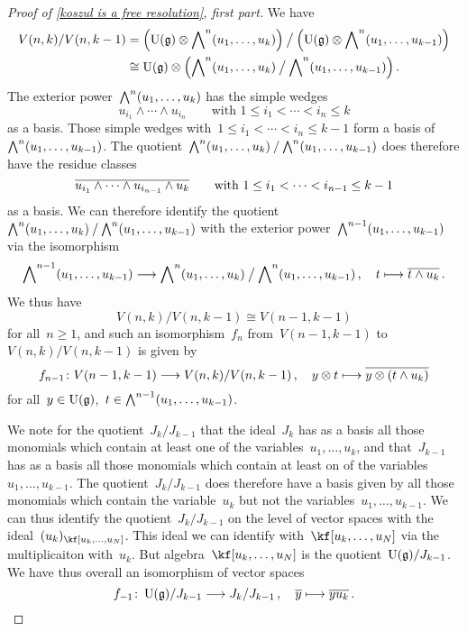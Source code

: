 \begin{proof}[Proof of \cref{koszul is a free resolution}, first part]
  We have
  \begin{align*}
    V(n,k) / V(n, k-1)
    &=
    \Bigl( \operatorname{U}(\mathfrak{g}) \otimes \operatorname{\bigwedge}^n( u_1, \dotsc, u_k ) \Bigr)
    \mathbin{\big/}
    \Bigl( \operatorname{U}(\mathfrak{g}) \otimes \operatorname{\bigwedge}^n( u_1, \dotsc, u_{k-1} ) \Bigr)
    \\
    &\cong
    \operatorname{U}(\mathfrak{g})
    \otimes
    \Bigl(
      \operatorname{\bigwedge}^n( u_1, \dotsc, u_k )
      \mathbin{\big/}
      \operatorname{\bigwedge}^n( u_1, \dotsc, u_{k-1} )
    \Bigr) \,.
  \end{align*}
  The exterior power~$\operatorname{\bigwedge}^n( u_1, \dotsc, u_k )$ has the simple wedges
  \[
    u_{i_1} \wedge \dotsb \wedge u_{i_n}
    \qquad
    \text{with~$1 \leq i_1 < \dotsb < i_n \leq k$}
  \]
  as a basis.
  Those simple wedges with~$1 \leq i_1 < \dotsb < i_n \leq k-1$ form a basis of~$\operatorname{\bigwedge}^n( u_1, \dotsc, u_{k-1} )$.
  The quotient~$\operatorname{\bigwedge}^n(u_1, \dotsc, u_k) \mathbin{/} \operatorname{\bigwedge}^n(u_1, \dotsc, u_{k-1})$ does therefore have the residue classes
  \[
    \overline{ u_{i_1} \wedge \dotsb \wedge u_{i_{n-1}} \wedge u_k }
    \qquad
    \text{with~$1 \leq i_1 < \dotsb < i_{n-1} \leq k-1$}
  \]
  as a basis.
  We can therefore identify the quotient~$\operatorname{\bigwedge}^n(u_1, \dotsc, u_k) \mathbin{/} \operatorname{\bigwedge}^n(u_1, \dotsc, u_{k-1})$ with the exterior power~$\operatorname{\bigwedge}^{n-1}(u_1, \dotsc, u_{k-1})$ via the isomorphism
  \[
    \Exterior^{n-1}(u_1, \dotsc, u_{k-1})
    \to
    \Exterior^n(u_1, \dotsc, u_k)
    \mathbin{\big/}
    \Exterior^n(u_1, \dotsc, u_{k-1}) \,,
    \quad
    t
    \mapsto
    \class{ t \wedge u_k } \,.
  \]
  We thus have
  \[
    V(n, k) / V(n, k-1)
    \cong
    V(n-1, k-1)
  \]
  for all~$n \geq 1$, and such an isomorphism~$f_n$ from~$V(n-1,k-1)$ to~$V(n,k) / V(n, k-1)$ is given by
  \[
    f_{n-1}
    \colon
    V(n-1, k-1)
    \to
    V(n,k) / V(n,k-1) \,,
    \quad
    y \otimes t
    \mapsto
    \class{ y \otimes (t \wedge u_k) }
  \]
  for all~$y \in \operatorname{U}(\mathfrak{g})$,~$t \in \operatorname{\bigwedge}^{n-1}(u_1, \dotsc, u_{k-1})$.

  We note for the quotient~$J_k / J_{k-1}$ that the ideal~$J_k$ has as a basis all those monomials which contain at least one of the variables~$u_1, \dotsc, u_k$, and that~$J_{k-1}$ has as a basis all those monomials which contain at least on of the variables~$u_1, \dotsc, u_{k-1}$.
  The quotient~$J_k / J_{k-1}$ does therefore have a basis given by all those monomials which contain the variable~$u_k$ but not the variables~$u_1, \dotsc, u_{k-1}$.
  We can thus identify the quotient~$J_k / J_{k-1}$ on the level of vector spaces with the ideal~$\ideal{u_k}_{\kf[u_k, \dotsc, u_N]}$.
  This ideal we can identify with~$\kf[u_k, \dotsc, u_N]$ via the multiplicaiton with~$u_k$.
  But algebra~$\kf[u_k, \dotsc, u_N]$ is the quotient~$\operatorname{U}(\mathfrak{g}) / J_{k-1}$.
  We have thus overall an isomorphism of vector spaces
  \[
    f_{-1}
    \colon
    \Univ(\glie) / J_{k-1}
    \to
    J_k / J_{k-1} \,,
    \quad
    \class{y}
    \mapsto
    \class{y u_k} \,.
  \]


\end{proof}
